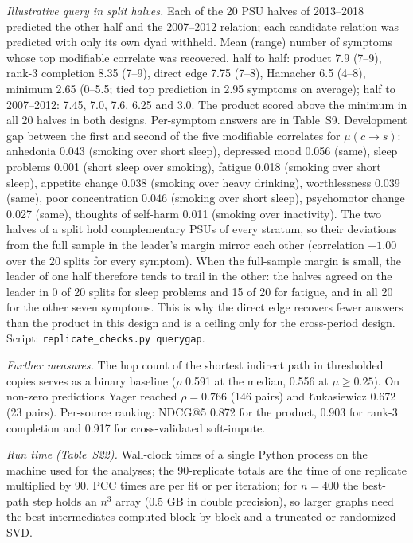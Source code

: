 \documentclass[journal]{IEEEtran}
\begin{document}
\emph{Illustrative query in split halves.} Each of the 20 PSU halves of 2013--2018 predicted the other half and the 2007--2012 relation; each candidate relation was predicted with only its own dyad withheld. Mean (range) number of symptoms whose top modifiable correlate was recovered, half to half: product 7.9 (7--9), rank-3 completion 8.35 (7--9), direct edge 7.75 (7--8), Hamacher 6.5 (4--8), minimum 2.65 (0--5.5; tied top prediction in 2.95 symptoms on average); half to 2007--2012: 7.45, 7.0, 7.6, 6.25 and 3.0. The product scored above the minimum in all 20 halves in both designs. Per-symptom answers are in Table~S9. Development gap between the first and second of the five modifiable correlates for $\mu(c\to s)$: anhedonia 0.043 (smoking over short sleep), depressed mood 0.056 (same), sleep problems 0.001 (short sleep over smoking), fatigue 0.018 (smoking over short sleep), appetite change 0.038 (smoking over heavy drinking), worthlessness 0.039 (same), poor concentration 0.046 (smoking over short sleep), psychomotor change 0.027 (same), thoughts of self-harm 0.011 (smoking over inactivity). The two halves of a split hold complementary PSUs of every stratum, so their deviations from the full sample in the leader's margin mirror each other (correlation $-1.00$ over the 20 splits for every symptom). When the full-sample margin is small, the leader of one half therefore tends to trail in the other: the halves agreed on the leader in 0 of 20 splits for sleep problems and 15 of 20 for fatigue, and in all 20 for the other seven symptoms. This is why the direct edge recovers fewer answers than the product in this design and is a ceiling only for the cross-period design. Script: \texttt{replicate\_checks.py querygap}.

\emph{Further measures.} The hop count of the shortest indirect path in thresholded copies serves as a binary baseline ($\rho$ 0.591 at the median, 0.556 at $\mu\ge0.25$). On non-zero predictions Yager reached $\rho=0.766$ (146 pairs) and {\L}ukasiewicz 0.672 (23 pairs). Per-source ranking: NDCG@5 0.872 for the product, 0.903 for rank-3 completion and 0.917 for cross-validated soft-impute.

\emph{Run time (Table~S22).} Wall-clock times of a single Python process on the machine used for the analyses; the 90-replicate totals are the time of one replicate multiplied by 90. PCC times are per fit or per iteration; for $n=400$ the best-path step holds an $n^3$ array (0.5 GB in double precision), so larger graphs need the best intermediates computed block by block and a truncated or randomized SVD.
\end{document}
